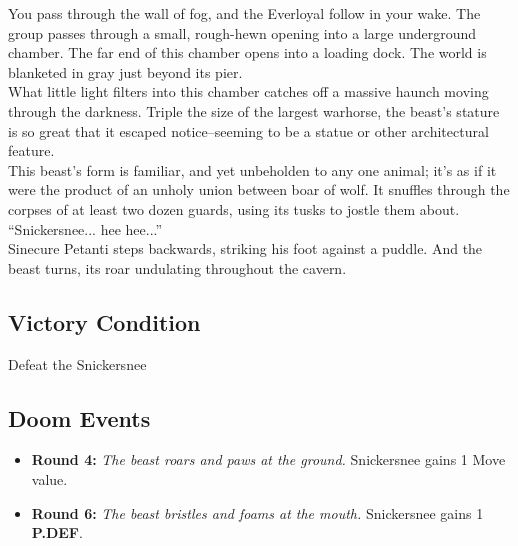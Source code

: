 You pass through the wall of fog, and the Everloyal follow in your wake. The group passes through a small, rough-hewn opening into a large underground chamber. The far end of this chamber opens into a loading dock. The world is blanketed in gray just beyond its pier.\\

What little light filters into this chamber catches off a massive haunch moving through the darkness. Triple the size of the largest warhorse, the beast's stature is so great that it escaped notice--seeming to be a statue or other architectural feature.\\

This beast's form is familiar, and yet unbeholden to any one animal; it's as if it were the product of an unholy union between boar of wolf. It snuffles through the corpses of at least two dozen guards, using its tusks to jostle them about.\\

“Snickersnee... hee hee...”\\

Sinecure Petanti steps backwards, striking his foot against a puddle. And the beast turns, its roar undulating throughout the cavern.

\subsection*{Victory Condition}
Defeat the Snickersnee

\begin{tcolorbox}
\subsection*{Doom Events}
\begin{itemize}
\item \textbf{Round 4:} \emph{The beast roars and paws at the ground.} Snickersnee gains 1 Move value.
\item \textbf{Round 6:} \emph{The beast bristles and foams at the mouth.} Snickersnee gains 1 \textbf{P.DEF}.
\end{itemize}
\end{tcolorbox}

